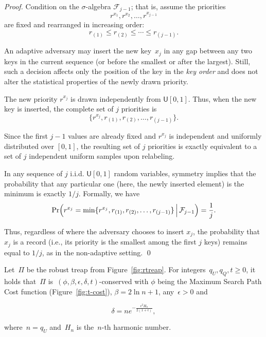 \begin{proof}
Condition on the $\sigma$-algebra $\mathcal{F}_{j-1}$; that is, assume the priorities
$$r^{x_1}, r^{x_2}, \ldots, r^{x_{j-1}}$$
are fixed and rearranged in increasing order:
$$r_{(1)} \le r_{(2)} \le \cdots \le r_{(j-1)}.$$

An adaptive adversary may insert the new key~$x_j$ in any gap between any two keys in the current sequence (or before the smallest or after the largest). Still, such a decision affects only the position of the key in the \emph{key order} and does not alter the statistical properties of the newly drawn priority.

The new priority $r^{x_j}$ is drawn independently from $\mathsf{U}[0,1]$. Thus, when the new key is inserted, the complete set of $j$ priorities is
$$\{r^{x_j}, r_{(1)}, r_{(2)}, \ldots, r_{(j-1)}\}.$$

Since the first $j-1$ values are already fixed and $r^{x_j}$ is independent and uniformly distributed over $[0,1]$, the resulting set of $j$ priorities is exactly equivalent to a set of $j$ independent uniform samples upon relabeling.

In any sequence of $j$ i.i.d. $\mathsf{U}[0,1]$ random variables, symmetry implies that the probability that any particular one (here, the newly inserted element) is the minimum is exactly $1/j$. Formally, we have
$$\Pr\Bigl(r^{x_j} = \min\{r^{x_j},r_{(1)}, r_{(2)}, \ldots, r_{(j-1)}\}\,\Big|\, \mathcal{F}_{j-1} \Bigr) = \frac{1}{j}.$$

Thus, regardless of where the adversary chooses to insert $x_j$, the probability that $x_j$ is a record (i.e., its priority is the smallest among the first $j$ keys) remains equal to $1/j$, as in the non-adaptive setting.
\qed
\end{proof}

\begin{theorem}\label{thm:tsb}
Let~$\Pi$ be the robust treap from Figure~\ref{fig:rtreap}. For integers~$q_U,q_Q,t \geq 0$, it holds that~$\Pi$ is~$(\phi,\beta,\epsilon,\delta,t)$-conserved with $\phi$ being the Maximum Search Path Cost function (Figure~\ref{fig:t-cost}), $\beta = 2\ln n + 1$, any~$\epsilon > 0$ and 
    
   $$\delta = n e^{-\frac{\epsilon^2 H_{n}}{2(1 + \epsilon)}},$$

where~$n=q_U$ and~$H_n$ is the~$n\text{-th}$ harmonic number.
\end{theorem}

